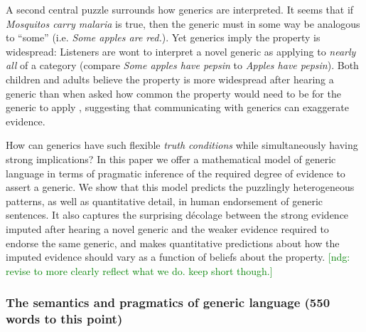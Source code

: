 \documentclass[10pt,letterpaper]{article}
\newcommand{\ndg}[1]{\textcolor{Green}{[ndg: #1]}}
\begin{document}
A second central puzzle surrounds how generics are interpreted. 
It seems that if \emph{Mosquitos carry malaria} is true, then the generic must in some way be analogous to ``some'' (i.e. \emph{Some apples are red.}). 
Yet generics imply the property is widespread: 
Listeners are wont to interpret a novel generic as applying to \emph{nearly all} of a category \cite{Gelman2002} (compare \emph{Some apples have pepsin} to \emph{Apples have pepsin}).
Both children and adults believe the property is more widespread after hearing a generic than when asked how common the property would need to be for the generic to apply \cite{Cimpian2010, Brandone2014}, suggesting that communicating with generics can exaggerate evidence.

How can generics have such flexible \emph{truth conditions} while simultaneously having strong implications?
In this paper we offer a mathematical model of generic language in terms of pragmatic inference of the required degree of evidence to assert a generic. 
We show that this model predicts the puzzlingly heterogeneous patterns, as well as quantitative detail, in human endorsement of generic sentences. 
It also captures the surprising d\'{e}colage \cite{Cimpian2010} between the strong evidence imputed after hearing a novel generic and the weaker evidence required to endorse the same generic, and makes quantitative predictions about how the imputed evidence should vary as a function of beliefs about the property.
 \ndg{revise to more clearly reflect what we do. keep short though.}



\subsubsection{The semantics and pragmatics of generic language  (550 words to this point)}
\end{document}
